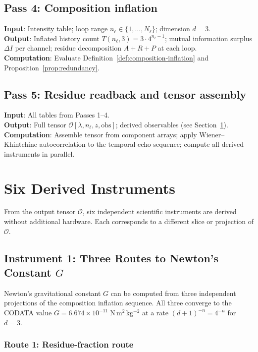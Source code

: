 \documentclass[11pt,twocolumn,a4paper]{article}
\theoremstyle{plain}
\theoremstyle{definition}
\theoremstyle{remark}
\begin{document}
\subsection{Pass 4: Composition inflation}

\textbf{Input}: Intensity table; loop range $n_\ell\in\{1,\ldots,N_\ell\}$; dimension $d=3$.\\
\textbf{Output}: Inflated history count $T(n_\ell,3)=3\cdot 4^{n_\ell-1}$; mutual information surplus $\Delta I$ per channel; residue decomposition $A+R+P$ at each loop.\\
\textbf{Computation}: Evaluate Definition~\ref{def:composition-inflation} and Proposition~\ref{prop:redundancy}.

\subsection{Pass 5: Residue readback and tensor assembly}

\textbf{Input}: All tables from Passes 1--4.\\
\textbf{Output}: Full tensor $\mathcal{O}[\lambda,n_\ell,z,\text{obs}]$; derived observables (see Section~\ref{sec:derived-instruments}).\\
\textbf{Computation}: Assemble tensor from component arrays; apply Wiener--Khintchine autocorrelation to the temporal echo sequence; compute all derived instruments in parallel.

\section{Six Derived Instruments}
\label{sec:derived-instruments}

From the output tensor $\mathcal{O}$, six independent scientific instruments are derived without additional hardware. Each corresponds to a different slice or projection of $\mathcal{O}$.

\subsection{Instrument 1: Three Routes to Newton's Constant $G$}
\label{sec:g-routes}

Newton's gravitational constant $G$ can be computed from three independent projections of the composition inflation sequence. All three converge to the CODATA value $G=6.674\times 10^{-11}\;\mathrm{N\,m^2\,kg^{-2}}$ \cite{LandauLifshitzMech} at a rate $(d+1)^{-n}=4^{-n}$ for $d=3$.

\subsubsection{Route 1: Residue-fraction route}
\end{document}
